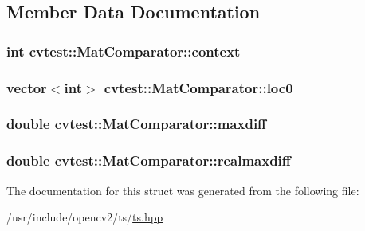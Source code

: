 \subsection{Member Data Documentation}
\hypertarget{structcvtest_1_1MatComparator_a297f8cc72e3d931ce1ae4a76d613a8db}{
\subsubsection[{context}]{\setlength{\rightskip}{0pt plus 5cm}int cvtest\-::\-Mat\-Comparator\-::context}}\label{structcvtest_1_1MatComparator_a297f8cc72e3d931ce1ae4a76d613a8db}
\hypertarget{structcvtest_1_1MatComparator_a34e7064df4897197ce644a36b3544619}{
\subsubsection[{loc0}]{\setlength{\rightskip}{0pt plus 5cm}vector$<$int$>$ cvtest\-::\-Mat\-Comparator\-::loc0}}\label{structcvtest_1_1MatComparator_a34e7064df4897197ce644a36b3544619}
\hypertarget{structcvtest_1_1MatComparator_a9fefb3c76f6b4ddf64aa35064124061e}{
\subsubsection[{maxdiff}]{\setlength{\rightskip}{0pt plus 5cm}double cvtest\-::\-Mat\-Comparator\-::maxdiff}}\label{structcvtest_1_1MatComparator_a9fefb3c76f6b4ddf64aa35064124061e}
\hypertarget{structcvtest_1_1MatComparator_a67d2d16b6cfdb37bea18b9980d8a5dee}{
\subsubsection[{realmaxdiff}]{\setlength{\rightskip}{0pt plus 5cm}double cvtest\-::\-Mat\-Comparator\-::realmaxdiff}}\label{structcvtest_1_1MatComparator_a67d2d16b6cfdb37bea18b9980d8a5dee}


The documentation for this struct was generated from the following file\-:\begin{DoxyCompactItemize}
\item 
/usr/include/opencv2/ts/\hyperlink{ts_8hpp}{ts.\-hpp}\end{DoxyCompactItemize}
